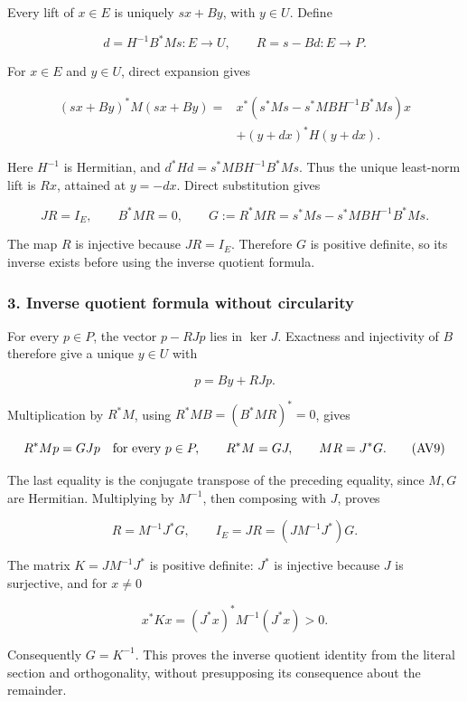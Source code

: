 Every lift of \(x\in E\) is uniquely \(sx+By\), with \(y\in U\). Define

\[
d=H^{-1}B^*Ms:E\longrightarrow U,\qquad
R=s-Bd:E\longrightarrow P.
\tag{AV5}
\]

For \(x\in E\) and \(y\in U\), direct expansion gives

\[
\begin{aligned}
(sx+By)^*M(sx+By)
={}&x^*(s^*Ms-s^*MBH^{-1}B^*Ms)x\\
&+(y+dx)^*H(y+dx).
\end{aligned}
\tag{AV6}
\]

Here \(H^{-1}\) is Hermitian, and \(d^*Hd=s^*MBH^{-1}B^*Ms\). Thus the unique least-norm lift is \(Rx\), attained at \(y=-dx\). Direct substitution gives

\[
JR=I_E,\qquad B^*MR=0,\qquad
G:=R^*MR=s^*Ms-s^*MBH^{-1}B^*Ms.
\tag{AV7}
\]

The map \(R\) is injective because \(JR=I_E\). Therefore \(G\) is positive definite, so its inverse exists before using the inverse quotient formula.

\subsubsection{3. Inverse quotient formula without circularity}\label{endpoint-variation_review--inverse-quotient-formula-without-circularity}

For every \(p\in P\), the vector \(p-RJp\) lies in \(\ker J\). Exactness and injectivity of \(B\) therefore give a unique \(y\in U\) with

\[
p=By+RJp.
\tag{AV8}
\]

Multiplication by \(R^*M\), using \(R^*MB=(B^*MR)^*=0\), gives

\[
R^*Mp=GJp\quad\hbox{for every }p\in P,\qquad
R^*M=GJ,\qquad MR=J^*G.
\tag{AV9}
\]

The last equality is the conjugate transpose of the preceding equality, since \(M,G\) are Hermitian. Multiplying by \(M^{-1}\), then composing with \(J\), proves

\[
R=M^{-1}J^*G,\qquad
I_E=JR=(JM^{-1}J^*)G.
\tag{AV10}
\]

The matrix \(K=JM^{-1}J^*\) is positive definite: \(J^*\) is injective because \(J\) is surjective, and for \(x\ne0\)

\[
x^*Kx=(J^*x)^*M^{-1}(J^*x)>0.
\tag{AV11}
\]

Consequently \(G=K^{-1}\). This proves the inverse quotient identity from the literal section and orthogonality, without presupposing its consequence about the remainder.

